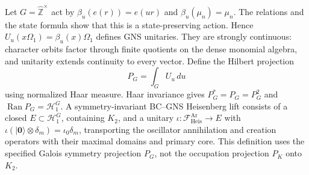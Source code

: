 \begin{definition}
\label{v4-arith:w5-b:def:bc-gns-heisenberg-lift}
Let $G=\widehat{\mathbb Z}^{\times}$ act by
$\beta_u(e(r))=e(ur)$ and $\beta_u(\mu_n)=\mu_n$.
The relations and the state formula show that this is a
state-preserving action. Hence
$U_u(x\Omega_1)=\beta_u(x)\Omega_1$ defines GNS unitaries.
They are strongly continuous: character orbits factor through finite
quotients on the dense monomial algebra, and unitarity extends
continuity to every vector. Define the Hilbert projection
\[
 P_G=\int_GU_u\,du
\]
using normalized Haar measure. Haar invariance gives
$P_G^*=P_G=P_G^2$ and $\operatorname{Ran}P_G=\mathcal H_1^G$.
A symmetry-invariant BC--GNS Heisenberg lift consists of a closed
$E\subset\mathcal H_1^G$, containing $K_2$, and a unitary
$\iota:\mathcal F^{\mathrm{Ar}}_{\mathrm{Heis}}\to E$ with
$\iota(|\mathbf0\rangle\otimes\delta_m)=\iota_0\delta_m$,
transporting the oscillator annihilation and creation operators
with their maximal domains and primary core. This definition uses
the specified Galois symmetry projection $P_G$, not the occupation
projection $P_K$ onto $K_2$.
\end{definition}

